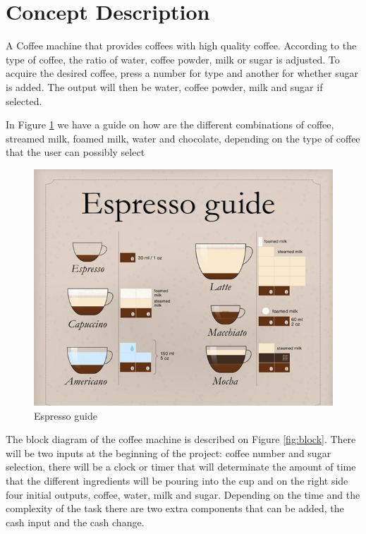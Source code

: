\documentclass[12pt]{article}
\begin{document}
\section{Concept Description}

A Coffee machine that provides coffees with high quality coffee. According to the type of coffee, the ratio of water, coffee powder, milk or sugar is adjusted. To acquire the desired coffee, press a number for type and another for whether sugar is added. The output will then be water, coffee powder, milk and sugar if selected.

In Figure \ref{fig:espresso} we have a guide on how are the different combinations of coffee, streamed milk, foamed milk, water and chocolate, depending on the type of coffee that the user can possibly select

\begin{figure}[!h]
\includegraphics[scale=0.83]{imgs/expesoguide.png}
\caption{Espresso guide}
\label{fig:espresso}
\end{figure}

The block diagram of the coffee machine is described on Figure \ref{fig:block}. There will be two inputs at the beginning of the project: coffee number and sugar selection, there will be a clock or timer that will determinate the amount of time that the different ingredients will be pouring into the cup and on the right side four initial outputs, coffee, water, milk and sugar. Depending on the time and the complexity of the task there are two extra components that can be added, the cash input and the cash change.
\end{document}
